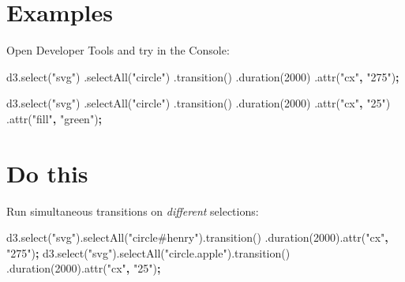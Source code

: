\documentclass[openany]{book}
\newenvironment{Shaded}{\begin{snugshade}}{\end{snugshade}}
\newcommand{\AttributeTok}[1]{\textcolor[rgb]{0.77,0.63,0.00}{#1}}
\newcommand{\DecValTok}[1]{\textcolor[rgb]{0.00,0.00,0.81}{#1}}
\newcommand{\NormalTok}[1]{#1}
\newcommand{\OperatorTok}[1]{\textcolor[rgb]{0.81,0.36,0.00}{\textbf{#1}}}
\newcommand{\StringTok}[1]{\textcolor[rgb]{0.31,0.60,0.02}{#1}}
\newcommand{\VariableTok}[1]{\textcolor[rgb]{0.00,0.00,0.00}{#1}}
\begin{document}
\hypertarget{examples-1}{%
\section{Examples}\label{examples-1}}

Open Developer Tools and try in the Console:

\begin{Shaded}
\begin{Highlighting}[]
\VariableTok{d3}\NormalTok{.}\AttributeTok{select}\NormalTok{(}\StringTok{"svg"}\NormalTok{)}
\NormalTok{  .}\AttributeTok{selectAll}\NormalTok{(}\StringTok{"circle"}\NormalTok{)}
\NormalTok{  .}\AttributeTok{transition}\NormalTok{()}
\NormalTok{  .}\AttributeTok{duration}\NormalTok{(}\DecValTok{2000}\NormalTok{)}
\NormalTok{  .}\AttributeTok{attr}\NormalTok{(}\StringTok{"cx"}\OperatorTok{,} \StringTok{"275"}\NormalTok{)}\OperatorTok{;}
\end{Highlighting}
\end{Shaded}

\begin{Shaded}
\begin{Highlighting}[]
\VariableTok{d3}\NormalTok{.}\AttributeTok{select}\NormalTok{(}\StringTok{"svg"}\NormalTok{)}
\NormalTok{  .}\AttributeTok{selectAll}\NormalTok{(}\StringTok{"circle"}\NormalTok{)}
\NormalTok{  .}\AttributeTok{transition}\NormalTok{()}
\NormalTok{  .}\AttributeTok{duration}\NormalTok{(}\DecValTok{2000}\NormalTok{)}
\NormalTok{  .}\AttributeTok{attr}\NormalTok{(}\StringTok{"cx"}\OperatorTok{,} \StringTok{"25"}\NormalTok{)}
\NormalTok{  .}\AttributeTok{attr}\NormalTok{(}\StringTok{"fill"}\OperatorTok{,} \StringTok{"green"}\NormalTok{)}\OperatorTok{;}
\end{Highlighting}
\end{Shaded}

\hypertarget{do-this}{%
\section{Do this}\label{do-this}}

Run simultaneous transitions on \emph{different} selections:

\begin{Shaded}
\begin{Highlighting}[]
\VariableTok{d3}\NormalTok{.}\AttributeTok{select}\NormalTok{(}\StringTok{"svg"}\NormalTok{).}\AttributeTok{selectAll}\NormalTok{(}\StringTok{"circle#henry"}\NormalTok{).}\AttributeTok{transition}\NormalTok{()}
\NormalTok{    .}\AttributeTok{duration}\NormalTok{(}\DecValTok{2000}\NormalTok{).}\AttributeTok{attr}\NormalTok{(}\StringTok{"cx"}\OperatorTok{,} \StringTok{"275"}\NormalTok{)}\OperatorTok{;}
\VariableTok{d3}\NormalTok{.}\AttributeTok{select}\NormalTok{(}\StringTok{"svg"}\NormalTok{).}\AttributeTok{selectAll}\NormalTok{(}\StringTok{"circle.apple"}\NormalTok{).}\AttributeTok{transition}\NormalTok{()}
\NormalTok{    .}\AttributeTok{duration}\NormalTok{(}\DecValTok{2000}\NormalTok{).}\AttributeTok{attr}\NormalTok{(}\StringTok{"cx"}\OperatorTok{,} \StringTok{"25"}\NormalTok{)}\OperatorTok{;}
\end{Highlighting}
\end{Shaded}
\end{document}
